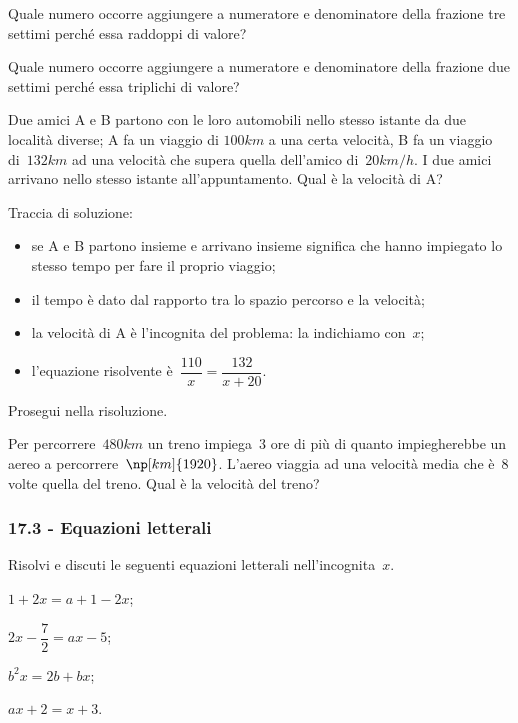 \begin{esercizio}[\Ast]
\label{ese:17.34}
Quale numero occorre aggiungere a numeratore e denominatore della frazione tre settimi perché essa raddoppi di valore?
\end{esercizio}

\begin{esercizio}[\Ast]
\label{ese:17.35}
Quale numero occorre aggiungere a numeratore e denominatore della frazione due settimi perché essa triplichi di valore?
\end{esercizio}

\begin{esercizio}
\label{ese:17.36}
Due amici A e B partono con le loro automobili nello stesso istante da due località diverse; A fa un viaggio di
$100\unit{km}$ a una certa velocità, B fa un viaggio di~$132\unit{km}$ ad una velocità che supera quella dell'amico di~$20\unit{km/h}$.
I due amici arrivano nello stesso istante all'appuntamento. Qual è la velocità di A?
\begin{center}
 
\end{center}
Traccia di soluzione:
\begin{itemize}
 \item se A e B partono insieme e arrivano insieme significa che hanno impiegato lo stesso tempo per fare il proprio viaggio;
 \item il tempo è dato dal rapporto tra lo spazio percorso e la velocità;
 \item la velocità di A è l'incognita del problema: la indichiamo con~$x$;
 \item l'equazione risolvente è~$\dfrac{110}{x}=\dfrac{132}{x+20}$.
\end{itemize}
Prosegui nella risoluzione.
\end{esercizio}

\begin{esercizio}
\label{ese:17.37}
Per percorrere~$480\unit{km}$ un treno impiega~$3$ ore di più di quanto impiegherebbe un aereo a percorrere~$\np[km]{1920}$.
L'aereo viaggia ad una velocità media che è~$8$ volte quella del treno. Qual è la velocità del treno?
\end{esercizio}


\subsubsection*{17.3 - Equazioni letterali}

\begin{esercizio}[\Ast]
\label{ese:17.38}
Risolvi e discuti le seguenti equazioni letterali nell'incognita~$x$.
\begin{multicols}{2}
\begin{enumeratea}
 \item $1+2x=a+1-2x$;
 \item $2x-\dfrac{7}{2}=ax-5$;
 \item $b^{2}x=2b+bx$;
 \item $ax+2=x+3$.
\end{enumeratea}
\end{multicols}
\end{esercizio}

